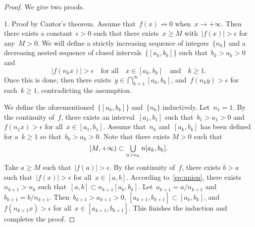 \documentclass[11pt,a4paper]{article}  %
\theoremstyle{definition}
\DeclareMathOperator*{\mcup}{\mathsmaller{\bigcup}}
\numberwithin{equation}{section}
\begin{document}
\begin{proof} We give two proofs.

  1. Proof by Cantor's theorem. Assume that~$f(x)\nrightarrow 0$ when~$x\to +\infty$. Then there
     exists a constant~$\epsilon > 0$ such that there exists~$x \ge M$ with~$|f(x)|>\epsilon$
     for any~$M > 0$.
     We will define
     a strictly increasing sequence of integers~$\{n_k\}$ and
     a decreasing nested sequence of closed intervals~$\{[a_k, b_k]\}$
     such that~$b_k>a_k > 0$ and
     \begin{equation}
       |f(n_kx)| > \epsilon \quad \text{for all}\quad x \in [a_k, b_k] \quad \text{and}\quad   k\ge 1.
     \end{equation}
     Once this is done, then there exists~$y\in\bigcap_{k=1}^\infty [a_k, b_k]$, and~$f(n_ky)> \epsilon$ for each~$k\ge 1$, contradicting the assumption.

     We define the aforementioned~$\{[a_k,b_k]\}$ and~$\{n_k\}$ inductively.
     Let~$n_1=1$. By the continuity of~$f$, there exists an interval~$[a_1, b_1]$ such
     that~$b_1>a_1>0$ and~$f(n_1x)> \epsilon$ for all~$x\in [a_1, b_1]$. Assume that~$n_k$
     and~$[a_k, b_k]$ has been defined for a~$k\ge 1$ so that~$b_k>a_k >0$. Note that there exists
     $M>0$ such that
     \begin{equation}
       \label{eq:union}
       [M, +\infty) \subset \mcup_{n> n_k} n[a_k, b_k].
     \end{equation}
     Take $a \ge  M$ such that~$|f(a)|> \epsilon$. By the continuity of~$f$, there exists
     $b>a$ such that~$|f(x)|>\epsilon$ for all~$x\in[a, b]$. According to~\eqref{eq:union},
     there exists $n_{k+1} > n_k$ such that~$[a, b] \subset n_{k+1}[a_k, b_k]$.
     Let~$a_{k+1} = a/n_{k+1}$ and~$b_{k+1} = b/n_{k+1}$. Then~$b_{k+1}>a_{k+1}>0$, $[a_{k+1},
     b_{k+1}]\subset[a_k, b_k]$, and~$f(n_{k+1}x) > \epsilon$ for all~$x\in [a_{k+1}, b_{k+1}]$.
     This finishes the induction and completes the proof.


\end{proof}
\end{document}
